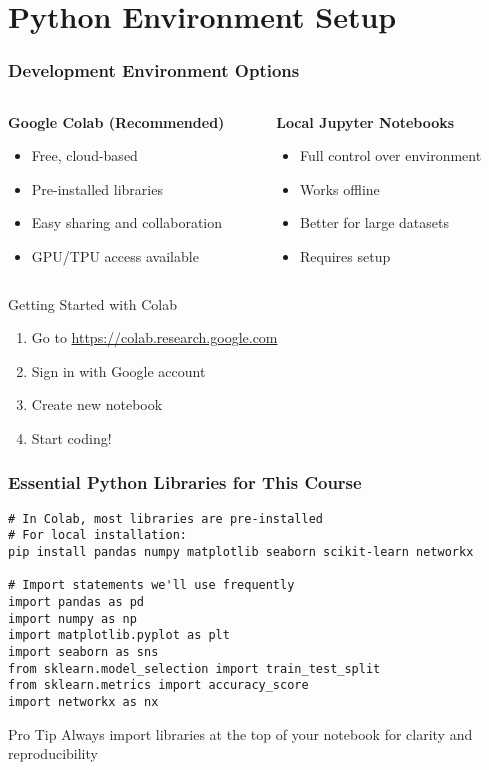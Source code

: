 \documentclass[aspectratio=169]{beamer}
\begin{document}
\section{Python Environment Setup}

\begin{frame}
\frametitle{Development Environment Options}
\begin{columns}
\begin{column}{0.5\textwidth}
\textbf{Google Colab (Recommended)}
\begin{itemize}
    \item Free, cloud-based
    \item Pre-installed libraries
    \item Easy sharing and collaboration
    \item GPU/TPU access available
\end{itemize}
\end{column}
\begin{column}{0.5\textwidth}
\textbf{Local Jupyter Notebooks}
\begin{itemize}
    \item Full control over environment
    \item Works offline
    \item Better for large datasets
    \item Requires setup
\end{itemize}
\end{column}
\end{columns}

\vspace{1em}
\begin{block}{Getting Started with Colab}
\begin{enumerate}
    \item Go to \url{https://colab.research.google.com}
    \item Sign in with Google account
    \item Create new notebook
    \item Start coding!
\end{enumerate}
\end{block}
\end{frame}

\begin{frame}[fragile]
\frametitle{Essential Python Libraries for This Course}
\begin{lstlisting}[caption=Installing Required Libraries]
# In Colab, most libraries are pre-installed
# For local installation:
pip install pandas numpy matplotlib seaborn scikit-learn networkx

# Import statements we'll use frequently
import pandas as pd
import numpy as np
import matplotlib.pyplot as plt
import seaborn as sns
from sklearn.model_selection import train_test_split
from sklearn.metrics import accuracy_score
import networkx as nx
\end{lstlisting}

\begin{alertblock}{Pro Tip}
Always import libraries at the top of your notebook for clarity and reproducibility
\end{alertblock}
\end{frame}
\end{document}
